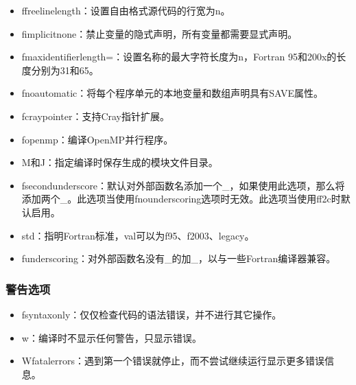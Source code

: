 \documentclass[a4paper,12pt,english]{sphinxmanual}
\begin{document}
\begin{itemize}
\item {} 
\sphinxAtStartPar
\sphinxhyphen{}ffree\sphinxhyphen{}line\sphinxhyphen{}length\sphinxhyphen{}：设置自由格式源代码的行宽为n。

\item {} 
\sphinxAtStartPar
\sphinxhyphen{}fimplicit\sphinxhyphen{}none：禁止变量的隐式声明，所有变量都需要显式声明。

\item {} 
\sphinxAtStartPar
\sphinxhyphen{}fmax\sphinxhyphen{}identifier\sphinxhyphen{}length=：设置名称的最大字符长度为n，Fortran 95和200x的长度分别为31和65。

\item {} 
\sphinxAtStartPar
\sphinxhyphen{}fno\sphinxhyphen{}automatic：将每个程序单元的本地变量和数组声明具有SAVE属性。

\item {} 
\sphinxAtStartPar
\sphinxhyphen{}fcray\sphinxhyphen{}pointer：支持Cray指针扩展。

\item {} 
\sphinxAtStartPar
\sphinxhyphen{}fopenmp：编译OpenMP并行程序。

\item {} 
\sphinxAtStartPar
\sphinxhyphen{}M和\sphinxhyphen{}J：指定编译时保存生成的模块文件目录。

\item {} 
\sphinxAtStartPar
\sphinxhyphen{}fsecond\sphinxhyphen{}underscore：默认对外部函数名添加一个\_，如果使用此选项，那么将添加两个\_。此选项当使用\sphinxhyphen{}fno\sphinxhyphen{}underscoring选项时无效。此选项当使用\sphinxhyphen{}ff2c时默认启用。

\item {} 
\sphinxAtStartPar
\sphinxhyphen{}std：指明Fortran标准，val可以为f95、f2003、legacy。

\item {} 
\sphinxAtStartPar
\sphinxhyphen{}funderscoring：对外部函数名没有\_的加\_，以与一些Fortran编译器兼容。

\end{itemize}


\subsubsection{警告选项}
\label{\detokenize{compiler/gnu:id4}}\begin{itemize}
\item {} 
\sphinxAtStartPar
\sphinxhyphen{}fsyntax\sphinxhyphen{}only：仅仅检查代码的语法错误，并不进行其它操作。

\item {} 
\sphinxAtStartPar
\sphinxhyphen{}w：编译时不显示任何警告，只显示错误。

\item {} 
\sphinxAtStartPar
\sphinxhyphen{}Wfatal\sphinxhyphen{}errors：遇到第一个错误就停止，而不尝试继续运行显示更多错误信息。

\end{itemize}
\end{document}
